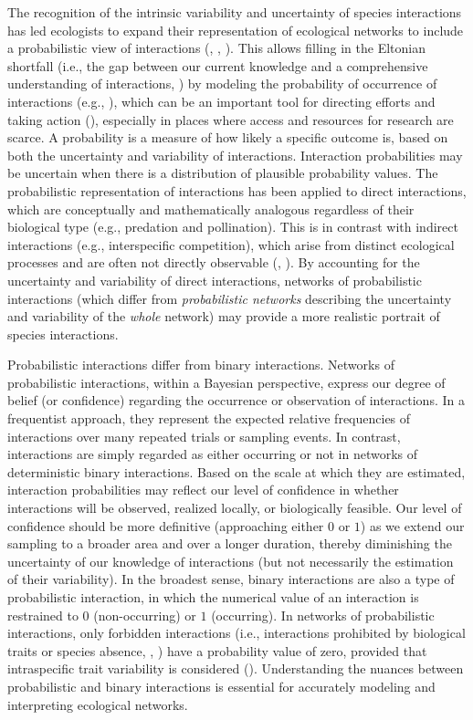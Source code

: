 The recognition of the intrinsic variability and uncertainty of species
interactions has led ecologists to expand their representation of ecological
networks to include a probabilistic view of interactions
(\cite{Poisot2016Structure}, \cite{Dallas2017Predicting}, \cite{Fu2021Link}).
This allows filling in the Eltonian shortfall (i.e., the gap between our current
knowledge and a comprehensive understanding of interactions,
\cite{Hortal2015Seven}) by modeling the probability of occurrence of
interactions (e.g., \cite{Gravel2019Bringing}), which can be an important tool
for directing efforts and taking action (\cite{Carlson2021Future}), especially
in places where access and resources for research are scarce. A probability is a
measure of how likely a specific outcome is, based on both the uncertainty and
variability of interactions. Interaction probabilities may be uncertain when
there is a distribution of plausible probability values. The probabilistic
representation of interactions has been applied to direct interactions, which
are conceptually and mathematically analogous regardless of their biological
type (e.g., predation and pollination). This is in contrast with indirect
interactions (e.g., interspecific competition), which arise from distinct
ecological processes and are often not directly observable
(\cite{Kefi2015Network}, \cite{Kefi2016How}). By accounting for the uncertainty
and variability of direct interactions, networks of probabilistic interactions
(which differ from \textit{probabilistic networks} describing the uncertainty
and variability of the \textit{whole} network) may provide a more realistic
portrait of species interactions. 

Probabilistic interactions differ from binary interactions. Networks of
probabilistic interactions, within a Bayesian perspective, express our degree of
belief (or confidence) regarding the occurrence or observation of interactions.
In a frequentist approach, they represent the expected relative frequencies of
interactions over many repeated trials or sampling events. In contrast,
interactions are simply regarded as either occurring or not in networks of
deterministic binary interactions. Based on the scale at which they are
estimated, interaction probabilities may reflect our level of confidence in
whether interactions will be observed, realized locally, or biologically
feasible. Our level of confidence should be more definitive (approaching either
$0$ or $1$) as we extend our sampling to a broader area and over a longer
duration, thereby diminishing the uncertainty of our knowledge of interactions
(but not necessarily the estimation of their variability). In the broadest
sense, binary interactions are also a type of probabilistic interaction, in
which the numerical value of an interaction is restrained to $0$ (non-occurring)
or $1$ (occurring). In networks of probabilistic interactions, only forbidden
interactions (i.e., interactions prohibited by biological traits or species
absence, \cite{Jordano2003Invarianta}, \cite{Olesen2010Missing}) have a
probability value of zero, provided that intraspecific trait variability is
considered (\cite{Gonzalez-Varo2016Labilea}). Understanding the nuances between
probabilistic and binary interactions is essential for accurately modeling and
interpreting ecological networks.

